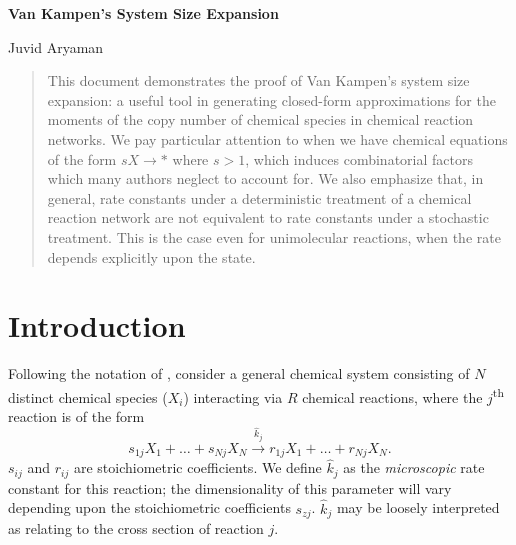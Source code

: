 \documentclass[10pt,letterpaper]{article}
\date{}
\begin{document}
\vspace*{0.35in}

\begin{flushleft}
{\Large
\textbf{Van Kampen's System Size Expansion}
}
\newline

\medskip

Juvid Aryaman



\end{flushleft}


\newcommand{\step}{\mathbb{E}_i^{-S_{ij}}}
\newcommand{\deriv}[2]{\frac{\text{d}#1}{\text{d}#2}}
\newcommand{\pderiv}[2]{\frac{\partial#1}{\partial#2}}
\newcommand{\pdd}[3]{\frac{\partial^2#1}{\partial#2\partial#3}}
\DeclarePairedDelimiter{\diagfences}{(}{)}
\newcommand{\diag}{\operatorname{diag}\diagfences}
\newcommand{\cov}{\operatorname{cov}\diagfences}

\begin{abstract}
This document demonstrates the proof of Van Kampen's system size expansion: a useful tool in generating closed-form approximations for the moments of the copy number of chemical species in chemical reaction networks. We pay particular attention to when we have chemical equations of the form $sX \rightarrow *$ where $s>1$, which induces combinatorial factors which many authors neglect to account for. We also emphasize that, in general, rate constants under a deterministic treatment of a chemical reaction network are not equivalent to rate constants under a stochastic treatment. This is the case even for unimolecular reactions, when the rate depends explicitly upon the state.
\end{abstract}

\section{Introduction}

Following the notation of \cite{Grima10}, consider a general chemical system consisting of $N$ distinct chemical species ($X_i$) interacting via $R$ chemical reactions, where the $j$\textsuperscript{th} reaction is of the form
\begin{equation}
s_{1j}X_1+\dots+s_{Nj}X_N \xrightarrow{\hat{k}_j} r_{1j} X_1+\dots+r_{Nj}X_N.
\end{equation}
$s_{ij}$ and $r_{ij}$ are stoichiometric coefficients. We define $\hat{k}_j$ as the \textit{microscopic} rate constant for this reaction; the dimensionality of this parameter will vary depending upon the stoichiometric coefficients $s_{zj}$. $\hat{k}_j$ may be loosely interpreted as relating to the cross section of reaction $j$. 
\end{document}

